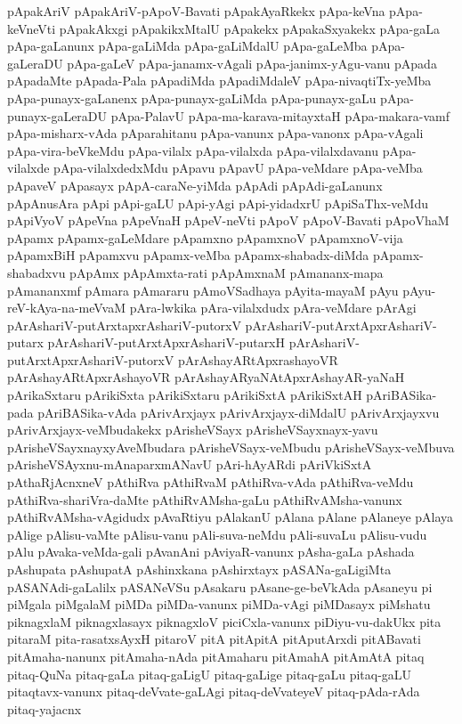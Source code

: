 {pApakAriV
pApakAriV-pApoV-Bavati
pApakAyaRkekx
pApa-keVna
pApa-keVneVti
pApakAkxgi
pApakikxMtalU
pApakekx
pApakaSxyakekx
pApa-gaLa
pApa-gaLanunx
pApa-gaLiMda
pApa-gaLiMdalU
pApa-gaLeMba
pApa-gaLeraDU
pApa-gaLeV
pApa-janamx-vAgali
pApa-janimx-yAgu-vanu
pApada
pApadaMte
pApada-Pala
pApadiMda
pApadiMdaleV
pApa-nivaqtiTx-yeMba
pApa-punayx-gaLanenx
pApa-punayx-gaLiMda
pApa-punayx-gaLu
pApa-punayx-gaLeraDU
pApa-PalavU
pApa-ma-karava-mitayxtaH
pApa-makara-vamf
pApa-misharx-vAda
pAparahitanu
pApa-vanunx
pApa-vanonx
pApa-vAgali
pApa-vira-beVkeMdu
pApa-vilalx
pApa-vilalxda
pApa-vilalxdavanu
pApa-vilalxde
pApa-vilalxdedxMdu
pApavu
pApavU
pApa-veMdare
pApa-veMba
pApaveV
pApasayx
pApA-caraNe-yiMda
pApAdi
pApAdi-gaLanunx
pApAnusAra
pApi
pApi-gaLU
pApi-yAgi
pApi-yidadxrU
pApiSaThx-veMdu
pApiVyoV
pApeVna
pApeVnaH
pApeV-neVti
pApoV
pApoV-Bavati
pApoVhaM
pApamx
pApamx-gaLeMdare
pApamxno
pApamxnoV
pApamxnoV-vija
pApamxBiH
pApamxvu
pApamx-veMba
pApamx-shabadx-diMda
pApamx-shabadxvu
pApAmx
pApAmxta-rati
pApAmxnaM
pAmananx-mapa
pAmananxmf
pAmara
pAmararu
pAmoVSadhaya
pAyita-mayaM
pAyu
pAyu-reV-kAya-na-meVvaM
pAra-lwkika
pAra-vilalxdudx
pAra-veMdare
pArAgi
pArAshariV-putArxtapxrAshariV-putorxV
pArAshariV-putArxtApxrAshariV-putarx
pArAshariV-putArxtApxrAshariV-putarxH
pArAshariV-putArxtApxrAshariV-putorxV
pArAshayARtApxrashayoVR
pArAshayARtApxrAshayoVR
pArAshayARyaNAtApxrAshayAR-yaNaH
pArikaSxtaru
pArikiSxta
pArikiSxtaru
pArikiSxtA
pArikiSxtAH
pAriBASika-pada
pAriBASika-vAda
pArivArxjayx
pArivArxjayx-diMdalU
pArivArxjayxvu
pArivArxjayx-veMbudakekx
pArisheVSayx
pArisheVSayxnayx-yavu
pArisheVSayxnayxyAveMbudara
pArisheVSayx-veMbudu
pArisheVSayx-veMbuva
pArisheVSAyxnu-mAnaparxmANavU
pAri-hAyARdi
pAriVkiSxtA
pAthaRjAcnxneV
pAthiRva
pAthiRvaM
pAthiRva-vAda
pAthiRva-veMdu
pAthiRva-shariVra-daMte
pAthiRvAMsha-gaLu
pAthiRvAMsha-vanunx
pAthiRvAMsha-vAgidudx
pAvaRtiyu
pAlakanU
pAlana
pAlane
pAlaneye
pAlaya
pAlige
pAlisu-vaMte
pAlisu-vanu
pAli-suva-neMdu
pAli-suvaLu
pAlisu-vudu
pAlu
pAvaka-veMda-gali
pAvanAni
pAviyaR-vanunx
pAsha-gaLa
pAshada
pAshupata
pAshupatA
pAshinxkana
pAshirxtayx
pASANa-gaLigiMta
pASANAdi-gaLalilx
pASANeVSu
pAsakaru
pAsane-ge-beVkAda
pAsaneyu
pi
piMgala
piMgalaM
piMDa
piMDa-vanunx
piMDa-vAgi
piMDasayx
piMshatu
piknagxlaM
piknagxlasayx
piknagxloV
piciCxla-vanunx
piDiyu-vu-dakUkx
pita
pitaraM
pita-rasatxsAyxH
pitaroV
pitA
pitApitA
pitAputArxdi
pitABavati
pitAmaha-nanunx
pitAmaha-nAda
pitAmaharu
pitAmahA
pitAmAtA
pitaq
pitaq-QuNa
pitaq-gaLa
pitaq-gaLigU
pitaq-gaLige
pitaq-gaLu
pitaq-gaLU
pitaqtavx-vanunx
pitaq-deVvate-gaLAgi
pitaq-deVvateyeV
pitaq-pAda-rAda
pitaq-yajacnx
}
